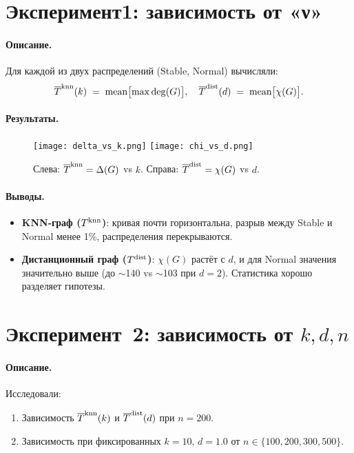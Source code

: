 \documentclass[12pt,a4paper]{article}
\begin{document}
\section{Эксперимент1: зависимость от «ν»}
\paragraph{Описание.}
Для каждой из двух распределений (Stable, Normal) вычисляли:
\[
\overline{T}^{\rm knn}(k)
\;=\;\text{mean}\bigl[\max\deg(G)\bigr],\quad
\overline{T}^{\rm dist}(d)
\;=\;\text{mean}\bigl[\chi(G)\bigr].
\]

\paragraph{Результаты.}
\begin{figure}[ht]
  \centering
  \texttt{[image: delta\_vs\_k.png]}
  \texttt{[image: chi\_vs\_d.png]}
  \caption{Слева: $\overline{T}^{\rm knn}=\Delta(G)$ vs $k$. 
           Справа: $\overline{T}^{\rm dist}=\chi(G)$ vs $d$.}
\end{figure}

\paragraph{Выводы.}
\begin{itemize}
  \item \textbf{KNN‑граф ($T^{\rm knn}$)}: кривая почти горизонтальна, 
    разрыв между Stable и Normal менее 1\%, распределения перекрываются.
  \item \textbf{Дистанционный граф ($T^{\rm dist}$)}: $\chi(G)$ растёт с $d$, 
    и для Normal значения значительно выше (до $\sim$140 vs $\sim$103 при $d=2$). 
    Статистика хорошо разделяет гипотезы.
\end{itemize}

\section{Эксперимент 2: зависимость от $k,d,n$}
\paragraph{Описание.}
Исследовали:
\begin{enumerate}
  \item Зависимость $\overline{T}^{\rm knn}(k)$ и $\overline{T}^{\rm dist}(d)$ при $n=200$.
  \item Зависимость при фиксированных $k=10$, $d=1.0$ от $n\in\{100,200,300,500\}$.
\end{enumerate}
\end{document}
